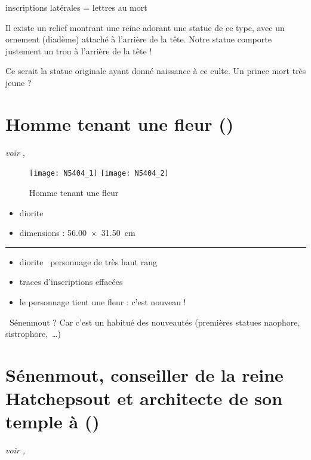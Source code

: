 \documentclass[dvipsnames,a4paper,twoside,10pt,openany,article]{memoir}
\newcommand{\separation}{%
  {\noi\hspace*{\fill}\rule{.33\textwidth}{1pt}\hspace*{\fill}}%
}
\begin{document}
inscriptions latérales = lettres au mort

Il existe un relief montrant une reine adorant une statue de ce type, 
avec un ornement (diadème) attaché à l'arrière de la tête.
Notre statue comporte justement un trou à l'arrière de la tête !

Ce serait la statue originale ayant donné naissance à ce culte. Un 
prince mort très jeune ?


\chapter{Homme tenant une fleur ()}
\label{sec:N5404}

\puceb{} \emph{voir , }
\bigskip

\begin{figure}[!h]
  \texttt{[image: N5404\_1]}
  \quad
  \texttt{[image: N5404\_2]}
  \caption{Homme tenant une fleur }
  \label{fig:N5404}
\end{figure}

\begin{itemize}
  \item diorite
  \item dimensions : \SI{56.00x31.50}{\cm}
\end{itemize}

\separation

\begin{itemize}
  \item diorite \donc~personnage de très haut rang
  \item traces d'inscriptions effacées
  \item le personnage tient une fleur : c'est nouveau !
\end{itemize}
\quad\donc~Sénenmout ? Car c'est un habitué des nouveautés (premières 
statues naophore, sistrophore,~\dots)


\chapter{Sénenmout, conseiller de la reine Hatchepsout et 
         \og architecte \fg de son temple à \DeB ()}
\label{sec:E11057}

\puceb{} \emph{voir , }
\bigskip
\end{document}

